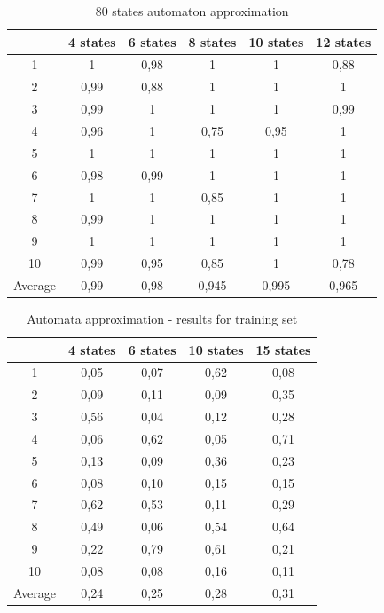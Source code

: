 \documentclass[runningheads,a4paper]{llncs}
\begin{document}
\begin{table}[]
\centering
\caption{80 states automaton approximation}
\label{my-label}
\begin{tabular}{@{}cccccc@{}}
\toprule
        & 4 states & 6 states & 8 states & 10 states & 12 states    \\ \midrule
1       & 1        & 0,98     & 1        & 1         & 0,88 \\
2       & 0,99     & 0,88     & 1        & 1         & 1 \\
3       & 0,99     & 1        & 1        & 1         & 0,99 \\
4       & 0,96     & 1        & 0,75     & 0,95      & 1   \\
5       & 1        & 1        & 1        & 1         & 1   \\
6       & 0,98     & 0,99     & 1        & 1         & 1    \\
7       & 1        & 1        & 0,85     & 1         & 1    \\
8       & 0,99     & 1        & 1        & 1         & 1     \\
9       & 1        & 1        & 1        & 1         & 1 \\
10      & 0,99     & 0,95     & 0,85     & 1         & 0,78  \\
Average & 0,99     & 0,98     & 0,945    & 0,995     & 0,965  \\ \bottomrule
\end{tabular}
\end{table}



\begin{table}[]
\centering
\caption{Automata approximation - results for training set}
\label{my-label}
\begin{tabular}{@{}ccccc@{}}
\toprule
        & 4 states & 6 states & 10 states & 15 states \\ \midrule
1       & 0,05     & 0,07     & 0,62      & 0,08      \\
2       & 0,09     & 0,11     & 0,09      & 0,35      \\
3       & 0,56     & 0,04     & 0,12      & 0,28      \\
4       & 0,06     & 0,62     & 0,05      & 0,71      \\
5       & 0,13     & 0,09     & 0,36      & 0,23      \\
6       & 0,08     & 0,10     & 0,15      & 0,15        \\
7       & 0,62     & 0,53     & 0,11      & 0,29        \\
8       & 0,49     & 0,06     & 0,54      & 0,64         \\
9       & 0,22     & 0,79     & 0,61      & 0,21     \\
10      & 0,08     & 0,08     & 0,16      & 0,11      \\
Average & 0,24     & 0,25     & 0,28      & 0,31      \\ \bottomrule
\end{tabular}
\end{table}
\end{document}
